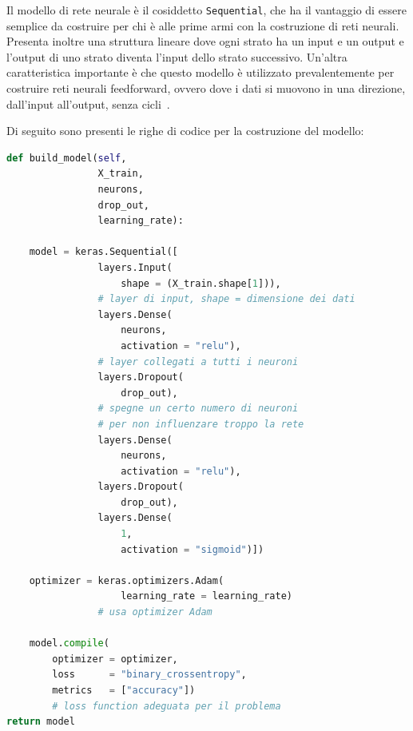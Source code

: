     Il modello di rete neurale è il cosiddetto \texttt{Sequential}, che ha il vantaggio di essere semplice da costruire per chi è alle prime armi con la costruzione di reti neurali. Presenta inoltre una struttura lineare dove ogni strato ha un input e un output e l’output di uno strato diventa l’input dello strato successivo. Un’altra caratteristica importante è che questo modello è utilizzato prevalentemente per costruire reti neurali feedforward, ovvero dove i dati si muovono in una direzione, dall’input all’output, senza cicli~\cite{Manaswi_2018}.

    Di seguito sono presenti le righe di codice per la costruzione del modello:
    \begin{lstlisting}[language=Python, style=myPython]
def build_model(self,
                X_train,
                neurons,
                drop_out,
                learning_rate):    
    
    model = keras.Sequential([
                layers.Input(
                    shape = (X_train.shape[1])),
                # layer di input, shape = dimensione dei dati
                layers.Dense(
                    neurons,
                    activation = "relu"),
                # layer collegati a tutti i neuroni
                layers.Dropout(
                    drop_out),
                # spegne un certo numero di neuroni
                # per non influenzare troppo la rete
                layers.Dense(
                    neurons,
                    activation = "relu"),
                layers.Dropout(
                    drop_out),
                layers.Dense(
                    1,
                    activation = "sigmoid")])

    optimizer = keras.optimizers.Adam(
                    learning_rate = learning_rate)
                # usa optimizer Adam

    model.compile(
        optimizer = optimizer,
        loss      = "binary_crossentropy",
        metrics   = ["accuracy"])
        # loss function adeguata per il problema
return model
    \end{lstlisting}
    
